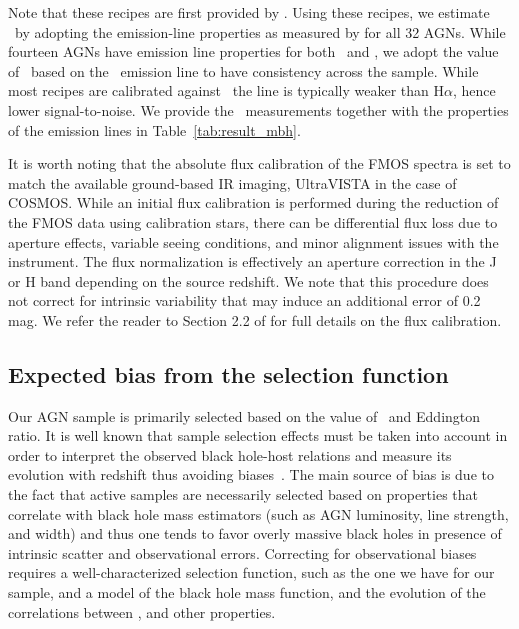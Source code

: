\documentclass[apj]{emulateapj}
\begin{document}
Note that these recipes are first provided by \citet{Vestergaard2006}. Using these recipes, we estimate \mbh\ by adopting the emission-line properties as measured by \citet{Schulze2018} for all 32 AGNs. While fourteen AGNs have emission line properties for both \halpha\ and \hbeta, we adopt the value of \mbh\ based on the \halpha\ emission line to have consistency across the sample. While most recipes are calibrated against \hbeta\, the line is typically weaker than H$\alpha$, hence lower signal-to-noise. We provide the \mbh\ measurements together with the properties of the emission lines in Table~\ref{tab:result_mbh}.    

It is worth noting that the absolute flux calibration of the FMOS spectra is set to match the available ground-based IR imaging, UltraVISTA in the case of COSMOS. While an initial flux calibration is performed during the reduction of the FMOS data using calibration stars, there can be differential flux loss due to aperture effects, variable seeing conditions, and minor alignment issues with the instrument. The flux normalization is effectively an aperture correction in the J or H band depending on the source redshift. We note that this procedure does not correct for intrinsic variability that may induce an additional error of 0.2 mag. We refer the reader to Section 2.2 of \citet{Schulze2018} for full details on the flux calibration.

\subsection{Expected bias from the selection function}

\label{sec:sf_framework}

Our AGN sample is primarily selected based on the value of \mbh~and Eddington ratio. It is well known that sample selection effects must be taken into account in order to  interpret the observed black hole-host relations and measure its evolution with redshift thus avoiding biases~\citep{Tre++07,Schulze2011,Bennert++2011, Schulze2014,Park15}. The main source of bias is due to the fact that active samples are necessarily selected based on properties that correlate with black hole mass estimators (such as AGN luminosity, line strength, and width) and thus one tends to favor overly massive black holes in presence of intrinsic scatter and observational errors. Correcting for observational biases requires a well-characterized selection function, such as the one we have for our sample, and a model of the black hole mass function, and the evolution of the correlations between \mbh, and other properties.
\end{document}
